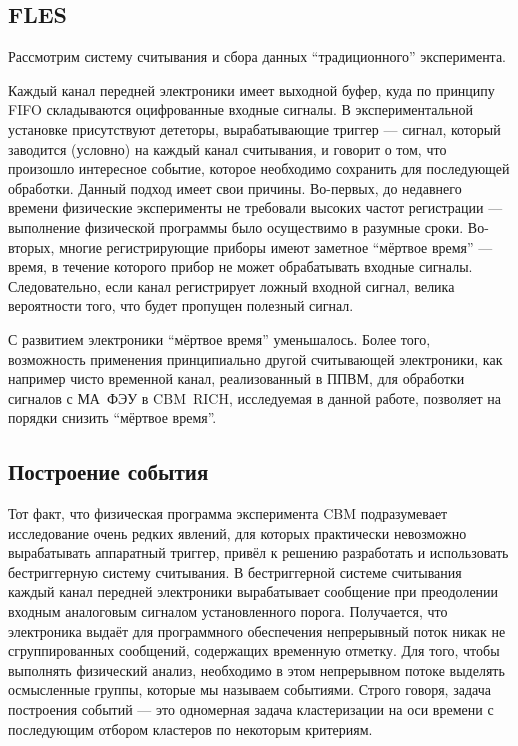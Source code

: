 \subsection{FLES}\label{sec:secFLES}

Рассмотрим систему считывания и сбора данных ``традиционного'' эксперимента.

Каждый канал передней электроники имеет выходной буфер, куда по принципу FIFO складываются оцифрованные входные сигналы. В экспериментальной установке присутствуют дететоры, вырабатывающие триггер --- сигнал, который заводится (условно) на каждый канал считывания, и говорит о том, что произошло интересное событие, которое необходимо сохранить для последующей обработки. Данный подход имеет свои причины. Во-первых, до недавнего времени физические эксперименты не требовали высоких частот регистрации --- выполнение физической программы было осуществимо в разумные сроки. Во-вторых, многие регистрирующие приборы имеют заметное ``мёртвое время'' --- время, в течение которого прибор не может обрабатывать входные сигналы. Следовательно, если канал регистрирует ложный входной сигнал, велика вероятности того, что будет пропущен полезный сигнал.

С развитием электроники ``мёртвое время'' уменьшалось. Более того, возможность применения принципиально другой считывающей электроники, как например чисто временной канал, реализованный в ППВМ, для обработки сигналов с МА~ФЭУ в CBM~RICH, исследуемая в данной работе, позволяет на порядки снизить ``мёртвое время''.


\subsection{Построение события}\label{sec:secEventBuilding}

Тот факт, что физическая программа эксперимента CBM подразумевает исследование очень редких явлений, для которых практически невозможно вырабатывать аппаратный триггер, привёл к решению разработать и использовать бестриггерную систему считывания. В бестриггерной системе считывания каждый канал передней электроники вырабатывает сообщение при преодолении входным аналоговым сигналом установленного порога. Получается, что электроника выдаёт для программного обеспечения непрерывный поток никак не сгруппированных сообщений, содержащих временную отметку. Для того, чтобы выполнять физический анализ, необходимо в этом непрерывном потоке выделять осмысленные группы, которые мы называем событиями. Строго говоря, задача построения событий --- это одномерная задача кластеризации на оси времени с последующим отбором кластеров по некоторым критериям.

